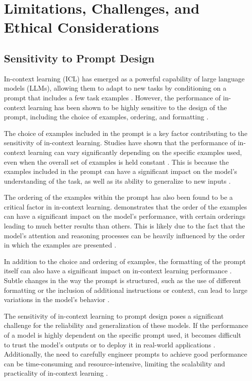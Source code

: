 \documentclass[11pt]{article}
\begin{document}
\section{Limitations, Challenges, and Ethical Considerations}

\subsection{Sensitivity to Prompt Design}

In-context learning (ICL) has emerged as a powerful capability of large language models (LLMs), allowing them to adapt to new tasks by conditioning on a prompt that includes a few task examples \cite{ref48}. However, the performance of in-context learning has been shown to be highly sensitive to the design of the prompt, including the choice of examples, ordering, and formatting \cite{ref317}.

The choice of examples included in the prompt is a key factor contributing to the sensitivity of in-context learning. Studies have shown that the performance of in-context learning can vary significantly depending on the specific examples used, even when the overall set of examples is held constant \cite{ref318}. This is because the examples included in the prompt can have a significant impact on the model's understanding of the task, as well as its ability to generalize to new inputs \cite{ref291}.

The ordering of the examples within the prompt has also been found to be a critical factor in in-context learning. \cite{ref51} demonstrates that the order of the examples can have a significant impact on the model's performance, with certain orderings leading to much better results than others. This is likely due to the fact that the model's attention and reasoning processes can be heavily influenced by the order in which the examples are presented \cite{ref292}.

In addition to the choice and ordering of examples, the formatting of the prompt itself can also have a significant impact on in-context learning performance \cite{ref48}. Subtle changes in the way the prompt is structured, such as the use of different formatting or the inclusion of additional instructions or context, can lead to large variations in the model's behavior \cite{ref317}.

The sensitivity of in-context learning to prompt design poses a significant challenge for the reliability and generalization of these models. If the performance of a model is highly dependent on the specific prompt used, it becomes difficult to trust the model's outputs or to deploy it in real-world applications \cite{ref319}. Additionally, the need to carefully engineer prompts to achieve good performance can be time-consuming and resource-intensive, limiting the scalability and practicality of in-context learning \cite{ref48}.
\end{document}
